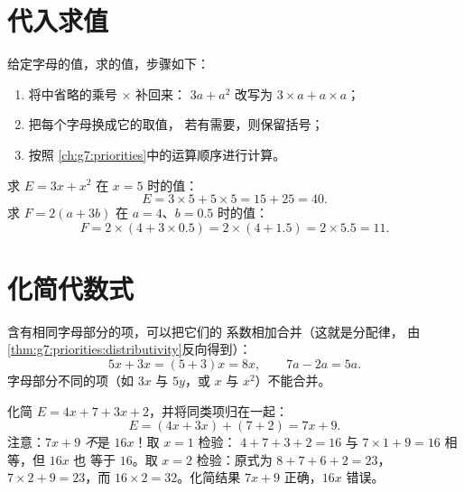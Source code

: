 \section{代入求值}

\begin{method}[代数式求值]\label{met:g7:literal:substitute}
给定字母的值，求的值，步骤如下：
\begin{enumerate}
  \item 将中省略的乘号 $\times$ 补回来：
        $3a + a^2$ 改写为 $3 \times a + a \times a$；
  \item 把每个字母换成它的取值，
        若有需要，则保留括号；
  \item 按照
        \cref{ch:g7:priorities}中的运算顺序进行计算。
\end{enumerate}
\end{method}

\begin{example}\label{ex:g7:literal:substitute}
求 $E = 3x + x^2$ 在 $x = 5$ 时的值：
\[
E = 3 \times 5 + 5 \times 5 = 15 + 25 = 40 .
\]
求 $F = 2(a + 3b)$ 在 $a = 4$、$b = 0.5$ 时的值：
\[
F = 2 \times (4 + 3 \times 0.5) = 2 \times (4 + 1.5) = 2 \times 5.5
= 11 .
\]
\end{example}

\section{化简代数式}

\begin{proposition}[合并同类项]\label{prop:g7:literal:reduce}
含有相同字母部分的项，可以把它们的
系数相加合并（这就是分配律，
由\cref{thm:g7:priorities:distributivity}反向得到）：
\[
5x + 3x = (5 + 3)x = 8x,
\qquad
7a - 2a = 5a .
\]
字母部分不同的项（如 $3x$ 与 $5y$，或 $x$ 与
$x^2$）不能合并。
\end{proposition}

\begin{example}\label{ex:g7:literal:reduce}
化简 $E = 4x + 7 + 3x + 2$，并将同类项归在一起：
\[
E = (4x + 3x) + (7 + 2) = 7x + 9 .
\]
注意：$7x + 9$ \emph{不}是 $16x$！取 $x = 1$ 检验：
$4 + 7 + 3 + 2 = 16$ 与 $7 \times 1 + 9 = 16$ 相等，但 $16x$ 也
等于 $16$。取 $x = 2$ 检验：原式为
$8 + 7 + 6 + 2 = 23$，$7 \times 2 + 9 = 23$，而
$16 \times 2 = 32$。化简结果 $7x + 9$ 正确，$16x$ 错误。
\end{example}

